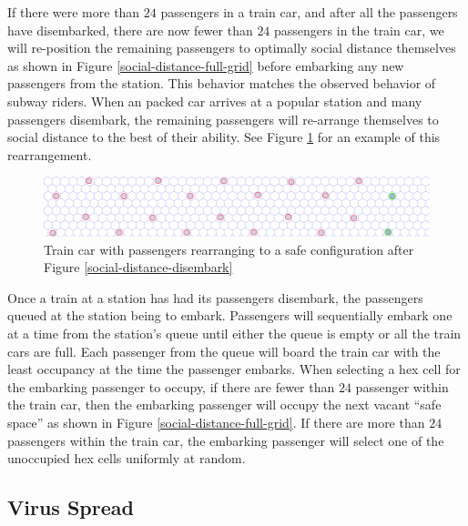 \documentclass[12pt]{article}
\begin{document}
If there were more than $24$ passengers in a train car, and after all the passengers have disembarked, there are now fewer than $24$ passengers in the train car, we will re-position the remaining passengers to optimally social distance themselves as shown in Figure \ref{social-distance-full-grid} before embarking any new passengers from the station.
This behavior matches the observed behavior of subway riders.
When an packed car arrives at a popular station and many passengers disembark, the remaining passengers will re-arrange themselves to social distance to the best of their ability.
See Figure \ref{social-distance-rearrange} for an example of this rearrangement. 

\begin{figure}[h]
	\centering
	\includegraphics[scale=.45]{./figures/hex-train-rearranged.png}
	\caption{Train car with passengers rearranging to a safe configuration after Figure \ref{social-distance-disembark}}
	\label{social-distance-rearrange}
\end{figure}

Once a train at a station has had its passengers disembark, the passengers queued at the station being to embark.
Passengers will sequentially embark one at a time from the station's queue until either the queue is empty or all the train cars are full.
Each passenger from the queue will board the train car with the least occupancy at the time the passenger embarks.
When selecting a hex cell for the embarking passenger to occupy, if there are fewer than $24$ passenger within the train car, then the embarking passenger will occupy the next vacant ``safe space'' as shown in Figure \ref{social-distance-full-grid}.
If there are more than $24$ passengers within the train car, the embarking passenger will select one of the unoccupied hex cells uniformly at random.

\subsection{Virus Spread}
\end{document}
